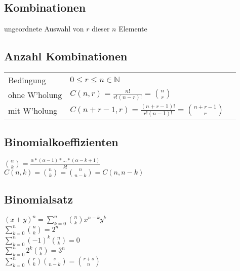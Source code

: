 \subsection{Kombinationen}
ungeordnete Auswahl von $r$ dieser $n$ Elemente


\subsection{Anzahl Kombinationen}
\begin{tabular}{lll}
    Bedingung & $0 \leq r \leq n \in \mathbb{N} $ \\
    ohne W'holung & $C(n,r) = \frac{n!}{r!(n-r)!} = \binom{n}{r}$ \\
    mit W'holung & $C(n+r-1,r) = \frac{(n+r-1)!}{r!(n-1)!} = \binom{n+r-1}{r} $\\
\end{tabular}

\subsection{Binomialkoeffizienten}
$ \binom{\alpha}{k} = \frac{\alpha * (\alpha - 1) * \dots * (\alpha - k + 1)}{k!} $ \\
$ C(n,k) = \binom{n}{k} = \binom{n}{n-k} = C(n, n-k)$

\subsection{Binomialsatz}
$ (x + y)^n = \sum_{k=0}^n \binom{n}{k} x^{n-k} y^k $ \\
$ \sum_{k=0}^n \binom{n}{k} = 2^n $ \\
$ \sum_{k=0}^n (-1)^k \binom{n}{k} = 0 $ \\
$ \sum_{k=0}^n 2^k \binom{n}{k} = 3^n $ \\
$ \sum_{k=0}^n \binom{r}{k} \binom{s}{n-k} = \binom{r + s}{n} $ \\

